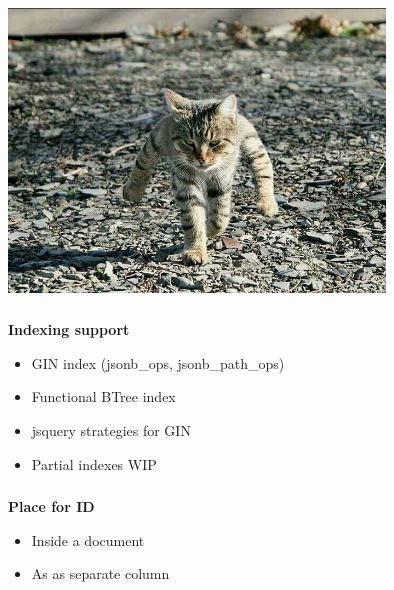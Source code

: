\documentclass[usenames,dvipsnames, 18pt, compress, aspectratio=169]{beamer}
\begin{document}
\begin{frame}
    \frametitle{}
    \begin{center}

        \includegraphics[width=0.75\textwidth,center]{cat.png}

    \end{center}
\end{frame}

\begin{frame}
    \frametitle{}
    \begin{center}
        \textbf{Indexing support}

        \begin{itemize}[label={\MVRightarrow}]
            \item GIN index (jsonb\_ops, jsonb\_path\_ops)
            \item Functional BTree index
            \item jsquery strategies for GIN
            \item Partial indexes WIP
        \end{itemize}

    \end{center}
\end{frame}

\begin{frame}
    \frametitle{}
    \begin{center}
        \textbf{Place for ID}

        \begin{itemize}[label={\MVRightarrow}]
            \item Inside a document
            \item As as separate column
        \end{itemize}

    \end{center}
\end{frame}
\end{document}
